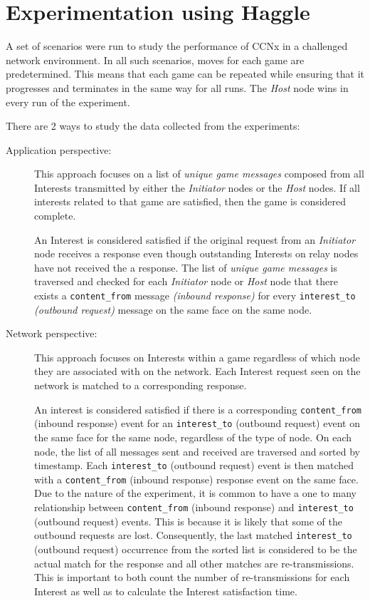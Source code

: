 \documentclass[a4paper,12pt]{report}      %
\begin{document}
\section{Experimentation using Haggle}

A set of scenarios were run to study the performance of CCNx in a challenged network environment.
In all such scenarios, moves for each game are predetermined. This means that each game can be repeated
 while ensuring that it progresses and terminates in the same way for all runs. The \emph{Host} node wins in every run of the experiment. 

\noindent There are 2 ways to study the data collected from the experiments:

\begin{description}
\item[Application perspective:] This approach focuses on a list of \textsl{unique game messages} composed from
all Interests transmitted by either the \emph{Initiator} nodes or the \emph{Host} nodes. If all interests related to that
game are satisfied, then the game is considered complete.

An Interest is considered satisfied if the original request from an \emph{Initiator} node receives a response even though outstanding Interests on relay nodes have not received the a response. The list
of \textsl{unique game messages} is traversed and checked for each \emph{Initiator} node or \emph{Host} node that there
exists a \verb!content_from! message \textit{(inbound response)} for every \verb!interest_to! \textit{(outbound request)} message on the same face on the same node.

\item[Network perspective:] This approach focuses on Interests within a game regardless of which node they are
 associated with on the network. Each Interest request seen on the network is matched to a
corresponding response.

An interest is considered satisfied if there is a corresponding \verb!content_from! (inbound response) event
for an \verb!interest_to! (outbound request) event on the same face for the same node, regardless of the type
of node. On each node, the list of all messages sent and received are traversed and sorted by timestamp.
Each \verb!interest_to! (outbound request) event is then matched with a \verb!content_from! (inbound response)
response event on the same face. Due to the nature of the experiment, it is common to have a one to
many relationship between \verb!content_from! (inbound response) and \verb!interest_to! (outbound request) events. This is because it is likely that some of the outbound requests are lost. Consequently, the last matched
\verb!interest_to! (outbound request) occurrence from the sorted list is considered to be the actual match for
the response and all other matches are re-transmissions. This is important to both count the number of
re-transmissions for each Interest as well as to calculate the Interest satisfaction time.
\end{description}
\end{document}
